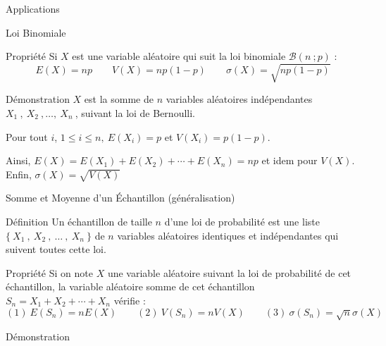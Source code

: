 \documentclass{cours}
\begin{document}
    \pagebreak
    \begin{Gpartie}{Applications} 
        \begin{Spartie}{Loi Binomiale} 
            \begin{SSpartie}{Propriété} 
                Si $X$ est une variable aléatoire qui suit la loi binomiale $\mathcal{B}\left(n~;p\right)$ : \[E(X)=np\qquad V(X)=np\left(1-p\right)\qquad\sigma(X)=\sqrt{np\left(1-p\right)}\]
                \begin{SSSpartie}{Démonstration} 
                    $X$ est la somme de $n$ variables aléatoires indépendantes $X_1~,~X_2~,\dotsc,~X_n~$, suivant la loi de Bernoulli.

                    Pour tout $i$, $1\leq i\leq n,~E\left(X_i\right)=p$ et $V\left(X_i\right)=p\left(1-p\right)$.

                    Ainsi, $E(X)=E\left(X_1\right)+E\left(X_2\right)+\dotsb+E\left(X_n\right)=np$ et idem pour $V(X)$. \\
                    Enfin, $\sigma(X)=\sqrt{V(X)}$
                \end{SSSpartie}
            \end{SSpartie}
        \end{Spartie}
        \begin{Spartie}{Somme et Moyenne d'un Échantillon (généralisation)} 
            \begin{SSpartie}{Définition} 
                Un échantillon de taille $n$ d'une loi de probabilité est une liste $\big\{~X_1~,~X_2~,~\dotsc~,~X_n~\big\}$ de $n$ variables aléatoires identiques et indépendantes qui suivent toutes cette loi.
            \end{SSpartie}
            \begin{SSpartie}{Propriété} 
                Si on note $X$ une variable aléatoire suivant la loi de probabilité de cet échantillon, la variable aléatoire \og somme \fg{} de cet échantillon $S_n=X_1+X_2+\dotsb+X_n$ vérifie : \[(1)~E\left(S_n\right)=nE(X)\qquad(2)~V\left(S_n\right)=nV(X)\qquad(3)~\sigma\left(S_n\right)=\sqrt{n}\sigma(X)\]
                \begin{SSSpartie}{Démonstration} 
\end{SSSpartie}
\end{SSpartie}
\end{Spartie}
\end{Gpartie}
\end{document}
